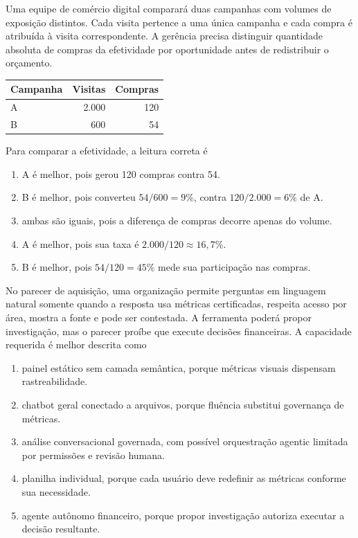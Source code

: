 \TextoBase Uma equipe de comércio digital comparará duas campanhas com volumes de exposição distintos. Cada visita pertence a uma única campanha e cada compra é atribuída à visita correspondente. A gerência precisa distinguir quantidade absoluta de compras da efetividade por oportunidade antes de redistribuir o orçamento.
\begin{center}\begin{tabular}{@{}lrr@{}}\toprule Campanha & Visitas & Compras\\\midrule A&2.000&120\\ B&600&54\\\bottomrule\end{tabular}\end{center}
\FonteDidatica
\Comando Para comparar a efetividade, a leitura correta é
\begin{enumerate}[label=\Alph*)]
\item A é melhor, pois gerou 120 compras contra 54.
\item B é melhor, pois converteu $54/600=9\%$, contra $120/2.000=6\%$ de A.
\item ambas são iguais, pois a diferença de compras decorre apenas do volume.
\item A é melhor, pois sua taxa é $2.000/120\approx16{,}7\%$.
\item B é melhor, pois $54/120=45\%$ mede sua participação nas compras.
\end{enumerate}

\TextoBase No parecer de aquisição, uma organização permite perguntas em linguagem natural somente quando a resposta usa métricas certificadas, respeita acesso por área, mostra a fonte e pode ser contestada. A ferramenta poderá propor investigação, mas o parecer proíbe que execute decisões financeiras.
\FonteDidatica
\Comando A capacidade requerida é melhor descrita como
\begin{enumerate}[label=\Alph*)]
\item painel estático sem camada semântica, porque métricas visuais dispensam rastreabilidade.
\item chatbot geral conectado a arquivos, porque fluência substitui governança de métricas.
\item análise conversacional governada, com possível orquestração agentic limitada por permissões e revisão humana.
\item planilha individual, porque cada usuário deve redefinir as métricas conforme sua necessidade.
\item agente autônomo financeiro, porque propor investigação autoriza executar a decisão resultante.
\end{enumerate}

